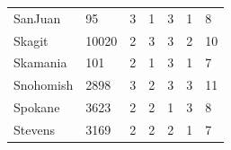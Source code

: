 \documentclass{mcmthesis}
\numberwithin{figure}{section}
\numberwithin{table}{section}
\begin{document}
\begin{table}[H]
\begin{tabular}{lllllll}
  SanJuan      & 95                                                     & 3                                                                             & 1                                                                 & 3                                                                           & 1                                                                                     & 8                                                                          \\
  Skagit       & 10020                                                  & 2                                                                             & 3                                                                 & 3                                                                           & 2                                                                                     & 10                                                                         \\
  Skamania     & 101                                                    & 2                                                                             & 1                                                                 & 3                                                                           & 1                                                                                     & 7                                                                          \\
  Snohomish    & 2898                                                   & 3                                                                             & 2                                                                 & 3                                                                           & 3                                                                                     & 11                                                                         \\
  Spokane      & 3623                                                   & 2                                                                             & 2                                                                 & 1                                                                           & 3                                                                                     & 8                                                                          \\
  Stevens      & 3169                                                   & 2                                                                             & 2                                                                 & 2                                                                           & 1                                                                                     & 7                                                                          \\

\end{tabular}
\end{table}
\end{document}
